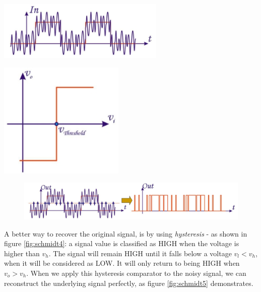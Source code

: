 \begin{minipage}{.5\textwidth}
	\centering
	\includegraphics[width=8cm]{figures/ch15/schmidt1.jpg}
	\label{fig:schmidt1}
\end{minipage}%
\begin{minipage}{.5\textwidth}
	\centering
	\includegraphics[width=6cm]{figures/ch15/schmidt2.jpg}
	\label{fig:schmidt2}
\end{minipage}

\begin{figure}[h!]
	\centering
	\includegraphics[width=16cm]{figures/ch15/schmidt3.jpg}
	\caption{}
	\label{fig:schmidt3}
\end{figure}

A better way to recover the original signal, is by using \emph{hysteresis} - as shown in figure \ref{fig:schmidt4}: a signal value is classified as HIGH when the voltage is higher than $v_h$. The signal will remain HIGH until it falls below a voltage $v_l < v_h$, when it will be considered as LOW. It will only return to being HIGH when $v_o > v_h$. When we apply this hysteresis comparator to the noisy signal, we can reconstruct the underlying signal perfectly, as figure \ref{fig:schmidt5} demonstrates.


